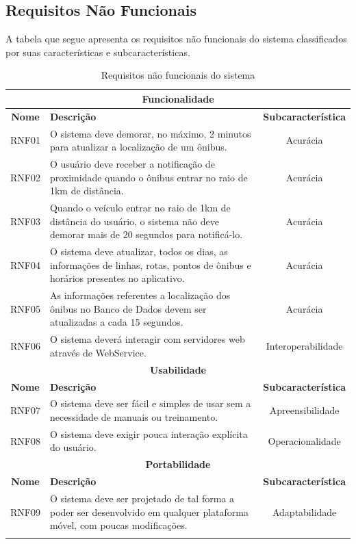 \subsection{Requisitos Não Funcionais}

A tabela que segue apresenta os requisitos não funcionais do sistema classificados por suas características e subcaracterísticas.

\begin{center}
\begin{longtable}{c|p{11cm}|c}
\hline
    \multicolumn{3}{c}{\textbf{Funcionalidade}} \\
    \hline
    \textbf{Nome} & \textbf{Descrição} & \textbf{Subcaracterística} \\
    \hline
    RNF01 & O sistema deve demorar, no máximo, 2 minutos para atualizar a localização de um ônibus. & Acurácia  \\
    \hline
    RNF02 & O usuário deve receber a notificação de proximidade quando o ônibus entrar no raio de 1km de distância. & Acurácia  \\
    \hline
    RNF03 & Quando o veículo entrar no raio de 1km de distância do usuário, o sistema não deve demorar mais de 20 segundos para notificá-lo.  & Acurácia  \\
    \hline
    RNF04 & O sistema deve atualizar, todos os dias, as informações de linhas, rotas, pontos de ônibus e horários presentes no aplicativo. & Acurácia  \\
    \hline
    RNF05 & As informações referentes a localização dos ônibus no Banco de Dados devem ser atualizadas a cada 15 segundos. & Acurácia  \\
    \hline
    RNF06 & O sistema deverá interagir com servidores web através de WebService. & Interoperabilidade  \\
    \hline
    \multicolumn{3}{c}{\textbf{Usabilidade}} \\
    \hline
    \textbf{Nome} & \textbf{Descrição} & \textbf{Subcaracterística} \\
    \hline
    RNF07 & O sistema deve ser fácil e simples de usar sem a necessidade de manuais ou treinamento.  & Apreensibilidade  \\
    \hline
    RNF08 & O sistema deve exigir pouca interação explícita do usuário.  & Operacionalidade  \\
    \hline
    \multicolumn{3}{c}{\textbf{Portabilidade}} \\
    \hline
    \textbf{Nome} & \textbf{Descrição} & \textbf{Subcaracterística} \\
    \hline
    RNF09 & O sistema deve ser projetado de tal forma a poder ser desenvolvido em qualquer plataforma móvel, com poucas modificações.  & Adaptabilidade  \\
\hline
\caption{Requisitos não funcionais do sistema}
\end{longtable}
\end{center}

